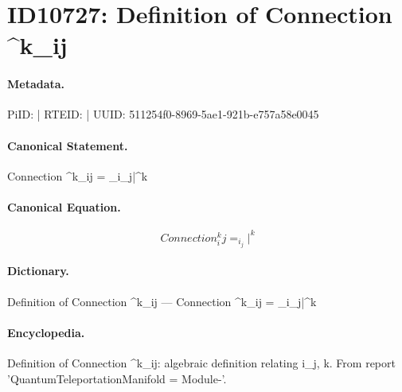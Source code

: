 \section*{ID10727: Definition of Connection \textasciicircum{}k\_ij}
\paragraph{Metadata.}
PiID:  | RTEID:  | UUID: 511254f0-8969-5ae1-921b-e757a58e0045

\paragraph{Canonical Statement.}
Connection \textasciicircum{}k\_ij = \_i\_j|\textasciicircum{}k

\paragraph{Canonical Equation.}
\[
Connection  ^k_ij = _i_j|^k
\]

\paragraph{Dictionary.}
Definition of Connection \textasciicircum{}k\_ij — Connection  \textasciicircum{}k\_ij = \_i\_j|\textasciicircum{}k

\paragraph{Encyclopedia.}
Definition of Connection \textasciicircum{}k\_ij: algebraic definition relating i\_j, k. From report 'QuantumTeleportationManifold = Module-'.
